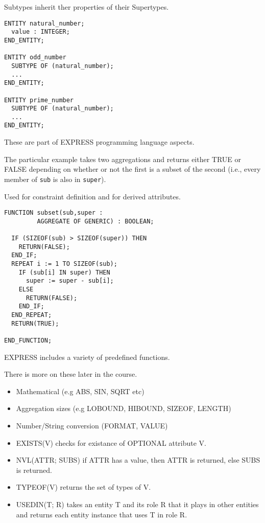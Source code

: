 
    Subtypes inherit ther properties of their Supertypes.

\begin{verbatim}
ENTITY natural_number;
  value : INTEGER;
END_ENTITY;

ENTITY odd_number
  SUBTYPE OF (natural_number);
  ...
END_ENTITY;

ENTITY prime_number
  SUBTYPE OF (natural_number);
  ...
END_ENTITY;
\end{verbatim}


\begin{remarks}
\remintro
{}

    These are part of EXPRESS programming language aspects.

    The particular example takes two aggregations and returns either
TRUE or FALSE depending on whether or not the first is a subset of 
the second (i.e., every member of \texttt{sub} is also in \texttt{super}).

\remend
\end{remarks}


    Used for constraint definition and for derived attributes.
\begin{verbatim}
FUNCTION subset(sub,super : 
         AGGREGATE OF GENERIC) : BOOLEAN;

  IF (SIZEOF(sub) > SIZEOF(super)) THEN
    RETURN(FALSE);
  END_IF;
  REPEAT i := 1 TO SIZEOF(sub);
    IF (sub[i] IN super) THEN
      super := super - sub[i];
    ELSE
      RETURN(FALSE);
    END_IF;
  END_REPEAT;
  RETURN(TRUE);

END_FUNCTION;
\end{verbatim}


\begin{remarks}
\remintro
{}

EXPRESS includes a variety of predefined functions. 

There is more on these later in the course.
\remend
\end{remarks}


\begin{itemize}
\item Mathematical (e.g ABS, SIN, SQRT etc)
\item Aggregation sizes (e.g LOBOUND, HIBOUND, SIZEOF, LENGTH)
\item Number/String conversion (FORMAT, VALUE)
\item EXISTS(V) checks for existance of OPTIONAL attribute V.
\item NVL(ATTR; SUBS) if ATTR has a value, then ATTR is returned,
      else SUBS is returned.
\item TYPEOF(V) returns the set of types of V.
\item USEDIN(T; R) takes an entity T and its role R that it plays in other
      entities and returns each entity instance that uses T in role R.
\end{itemize}


